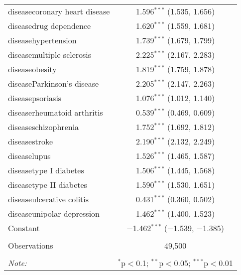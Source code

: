 \begin{table}[!htbp]
\begin{tabular}{@{\extracolsep{5pt}}lc}
  diseasecoronary heart disease & 1.596$^{***}$ (1.535, 1.656) \\ 
  diseasedrug dependence & 1.620$^{***}$ (1.559, 1.681) \\ 
  diseasehypertension & 1.739$^{***}$ (1.679, 1.799) \\ 
  diseasemultiple sclerosis & 2.225$^{***}$ (2.167, 2.283) \\ 
  diseaseobesity & 1.819$^{***}$ (1.759, 1.878) \\ 
  diseaseParkinson's disease & 2.205$^{***}$ (2.147, 2.263) \\ 
  diseasepsoriasis & 1.076$^{***}$ (1.012, 1.140) \\ 
  diseaserheumatoid arthritis & 0.539$^{***}$ (0.469, 0.609) \\ 
  diseaseschizophrenia & 1.752$^{***}$ (1.692, 1.812) \\ 
  diseasestroke & 2.190$^{***}$ (2.132, 2.249) \\ 
  diseaselupus & 1.526$^{***}$ (1.465, 1.587) \\ 
  diseasetype I diabetes & 1.506$^{***}$ (1.445, 1.568) \\ 
  diseasetype II diabetes & 1.590$^{***}$ (1.530, 1.651) \\ 
  diseaseulcerative colitis & 0.431$^{***}$ (0.360, 0.502) \\ 
  diseaseunipolar depression & 1.462$^{***}$ (1.400, 1.523) \\ 
  Constant & $-$1.462$^{***}$ ($-$1.539, $-$1.385) \\ 
 \hline \\[-1.8ex] 
Observations & 49,500 \\ 
\hline 
\hline \\[-1.8ex] 
\textit{Note:}  & \multicolumn{1}{r}{$^{*}$p$<$0.1; $^{**}$p$<$0.05; $^{***}$p$<$0.01} \\ 
\end{tabular} 
\end{table} 

